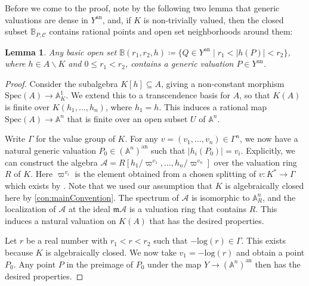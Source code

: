 \documentclass[12pt,reqno,a4paper]{amsart}
\theoremstyle{theoremstyle}
\newtheorem{lemma}[theorem]{Lemma}
\theoremstyle{examplestyle}
\theoremstyle{algorithmstyle}
\newcommand{\an}{{\mathrm{an}}}
\begin{document}
Before we come to the proof, note by the following two lemma that generic valuations are dense in $Y^\an$, and, if $K$ is non-trivially valued, then the closed subset $\mathbb{B}_{P,\mathcal{C}}$ contains rational points and open set neighborhoods around them:

\begin{lemma}\label{lem:GenericValuations3}
  Any basic open set $\mathbb{B}(r_{1},r_{2},h)\coloneqq \{Q\in Y^\an\mid r_1<|h(P)|<r_2\}$, where $h\in {A\backslash K}$ and $0\leq r_{1}<r_{2}$, contains a generic valuation $P\in Y^{\an}$.
\end{lemma}
    \begin{proof}
  Consider the subalgebra $K[h]\subseteq{A}$, giving a non-constant morphism $\mathrm{Spec}(A)\to\mathbb{A}^{1}_{K}$. We extend this to a transcendence basis for $A$, so that $K(A)$ is finite over $K(h_{1},\dots,h_{n})$, where $h_{1}=h$. This induces a rational map $\mathrm{Spec}(A)\to\mathbb{A}^{n}$ that is finite over an open subset $U$ of $\mathbb{A}^{n}$.

  Write $\Gamma$ for the value group of $K$. For any $v=(v_1,\dots,v_n)\in\Gamma^{n}$, we now have a natural generic valuation $P_{0}\in (\mathbb{A}^{n})^{\an}$ such that $|h_{i}(P_{0})|=v_{i}$. Explicitly, we can construct the algebra $\mathcal{A}=R[h_{1}/\varpi^{v_{1}},\dots,h_{n}/\varpi^{v_{n}}]$ over the valuation ring $R$ of $K$. Here $\varpi^{v_{i}}$ is the element obtained from a chosen splitting of $v\colon K^{*}\to \Gamma$ which exists by \cite[Lemma 2.1.15]{MS15}. Note that we used our assumption that $K$ is algebraically closed here by \cref{con:mainConvention}. The spectrum of $\mathcal{A}$ is isomorphic to $\mathbb{A}^{n}_{R}$, and the localization of $\mathcal{A}$ at the ideal $\mathfrak{m}\mathcal{A}$ is a valuation ring that contains $R$. This induces a natural valuation on $K(A)$ that has the desired properties.

  Let $r$ be a real number with $r_{1}<r<r_{2}$ such that $-\mathrm{log}(r)\in\Gamma$. This exists because $K$ is algebraically closed.
We now take $v_{1}=-\mathrm{log}(r)$ and obtain a point $P_{0}$. Any point $P$ in the preimage of $P_{0}$ under the map $Y\to (\mathbb{A}^{n})^{\an}$ then has the desired properties.
%
\end{proof}
\end{document}
